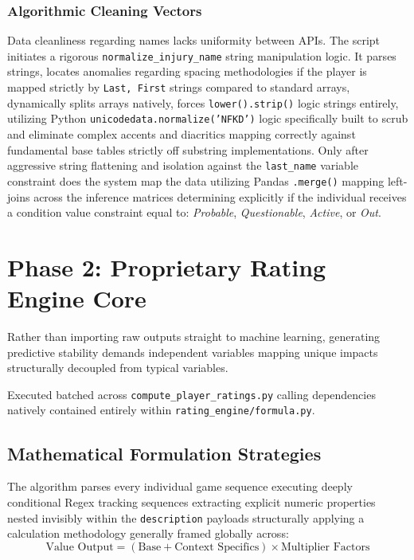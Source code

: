 \documentclass[12pt,a4paper]{article}
\begin{document}
\subsubsection{Algorithmic Cleaning Vectors}
Data cleanliness regarding names lacks uniformity between APIs. The script initiates a rigorous \texttt{normalize\_injury\_name} string manipulation logic. It parses strings, locates anomalies regarding spacing methodologies if the player is mapped strictly by \texttt{Last, First} strings compared to standard arrays, dynamically splits arrays natively, forces \texttt{lower().strip()} logic strings entirely, utilizing Python \texttt{unicodedata.normalize('NFKD')} logic specifically built to scrub and eliminate complex accents and diacritics mapping correctly against fundamental base tables strictly off substring implementations. Only after aggressive string flattening and isolation against the \texttt{last\_name} variable constraint does the system map the data utilizing Pandas \texttt{.merge()} mapping left-joins across the inference matrices determining explicitly if the individual receives a condition value constraint equal to: \textit{Probable}, \textit{Questionable}, \textit{Active}, or \textit{Out}.

\section{Phase 2: Proprietary Rating Engine Core}
Rather than importing raw outputs straight to machine learning, generating predictive stability demands independent variables mapping unique impacts structurally decoupled from typical variables.

Executed batched across \texttt{compute\_player\_ratings.py} calling dependencies natively contained entirely within \texttt{rating\_engine/formula.py}.

\subsection{Mathematical Formulation Strategies}
The algorithm parses every individual game sequence executing deeply conditional Regex tracking sequences extracting explicit numeric properties nested invisibly within the \texttt{description} payloads structurally applying a calculation methodology generally framed globally across:
\[ \text{Value Output} = (\text{Base} + \text{Context Specifics}) \times \text{Multiplier Factors} \]
\end{document}

